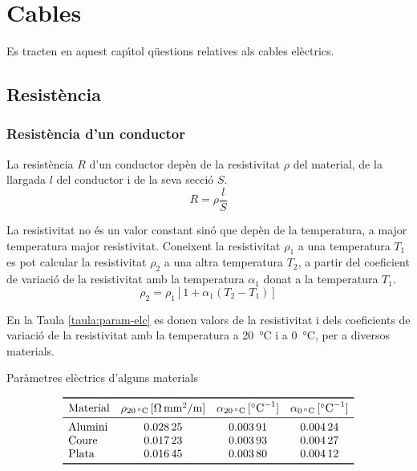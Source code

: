\chapter{Cables}

Es tracten en aquest cap\'{\i}tol q\"{u}estions relatives als cables el\`{e}ctrics.

\section{Resist\`{e}ncia}

\subsection{Resist\`{e}ncia d'un conductor}

La resist\`{e}ncia $R$ d'un conductor dep\`{e}n de la resistivitat $\rho$
del material, de la llargada $l$ del conductor i de la seva secci\'{o}
$S$.
\begin{equation}
   R= \rho \frac{l}{S}
\end{equation}
\index{$\rho$}

La resistivitat no
\'{e}s un valor constant sin\'{o} que dep\`{e}n de la temperatura, a major
temperatura major resistivitat. Coneixent la resistivitat $\rho_1$ a una
temperatura $T_1$ es pot calcular la resistivitat $\rho_2$ a una altra
temperatura $T_2$, a partir del coeficient de variaci\'{o} de la
resistivitat amb la temperatura $\alpha_1$ donat a la temperatura $T_1$.
\begin{equation}
   \rho_2 = \rho_1 [1 + \alpha_1 (T_2 - T_1)]\label{eq:resistivitat}
\end{equation}
\index{$\alpha$}

En la Taula
\vref{taula:param-elc} es donen valors de la resistivitat i dels
coeficients de variaci\'{o} de la resistivitat amb la temperatura a
\SI{20}{\celsius} i a \SI{0}{\celsius}, per a diversos materials.
\begin{table}[htb]
   \caption{\label{taula:param-elc} Par\`{a}metres el\`{e}ctrics d'alguns materials}
   \[ \begin{array}{lccc}
   \toprule[1pt]
   \text{Material} & \rho_{\SI{20}{\celsius}}\,[\si{\ohm.mm^2/m}] & \alpha_{\SI{20}{\celsius}}\,[\si{\celsius^{-1}}] &
   \alpha_{\SI{0}{\celsius}}\,[\si{\celsius^{-1}}]
   \\
   \midrule
      \text{Alumini} & \num{0,02825} & \num{0,00391} & \num{0,00424} \\
      \text{Coure}   & \num{0,01723} & \num{0,00393} & \num{0,00427} \\
      \text{Plata}   & \num{0,01645} & \num{0,00380} & \num{0,00412} \\
   \bottomrule[1pt]
   \end{array}   \]
\end{table}

